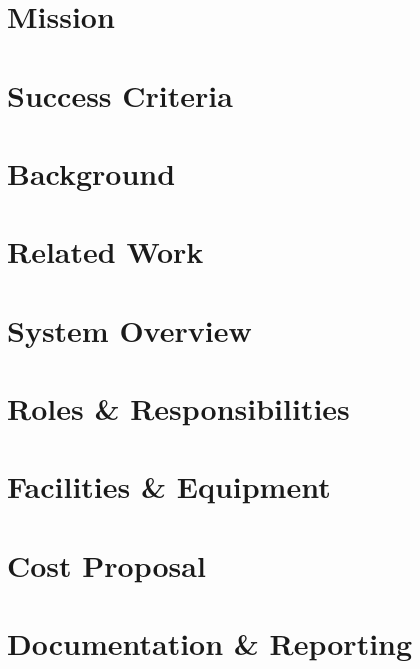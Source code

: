 \documentclass[11pt,letterpaper]{article}
\begin{document}
\section{Mission}

\section{Success Criteria}

\newpage

\section{Background}

\section{Related Work}

\section{System Overview}

\section{Roles \& Responsibilities}

\section{Facilities \& Equipment}

\section{Cost Proposal}

\section{Documentation \& Reporting}

\newpage



{}
\end{document}

